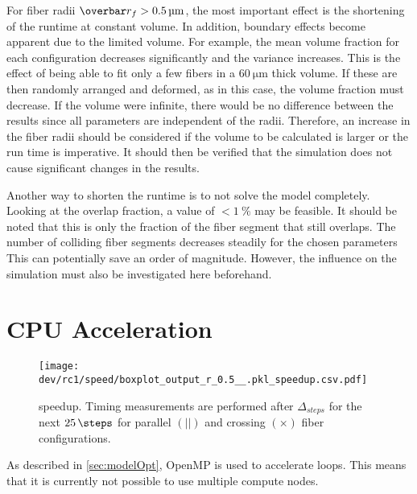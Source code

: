 %
For fiber radii $\fiberRadiusMean > \SI{0.5}{\micro\meter}$, the most important effect is the shortening of the runtime at constant volume.
In addition, boundary effects become apparent due to the limited volume.
For example, the mean volume fraction for each configuration decreases significantly and the variance increases.
This is the effect of being able to fit only a few fibers in a $\SI{60}{\micro\meter}$ thick volume.
If these are then randomly arranged and deformed, as in this case, the volume fraction must decrease.
If the volume were infinite, there would be no difference between the results since all parameters are independent of the radii.
Therefore, an increase in the fiber radii should be considered if the volume to be calculated is larger or the run time is imperative.
It should then be verified that the simulation does not cause significant changes in the results.
\par
%
Another way to shorten the runtime is to not solve the model completely.
Looking at the overlap fraction, a value of $<\SI{1}{\percent}$ may be feasible.
It should be noted that this is only the fraction of the fiber segment that still overlaps.
The number of colliding fiber segments decreases steadily for the chosen parameters
This can potentially save an order of magnitude.
However, the influence on the simulation must also be investigated here beforehand.
%
%
%
%
\section{CPU Acceleration}
%
\begin{figure}[!t]
\centering
\texttt{[image: dev/rc1/speed/boxplot\_output\_r\_0.5\_\_.pkl\_speedup.csv.pdf]}
\caption{ speedup. Timing measurements are performed after $\Delta_{\mathit{steps}}$ for the next $\SI{25}{\steps}$ for parallel $(||)$ and crossing $(\times)$ fiber configurations.}
\label{fig:solverSpeedup}
\end{figure}
%
As described in \cref{sec:modelOpt}, \ac{OpenMP} is used to accelerate  loops.
This means that it is currently not possible to use multiple compute nodes.
%
